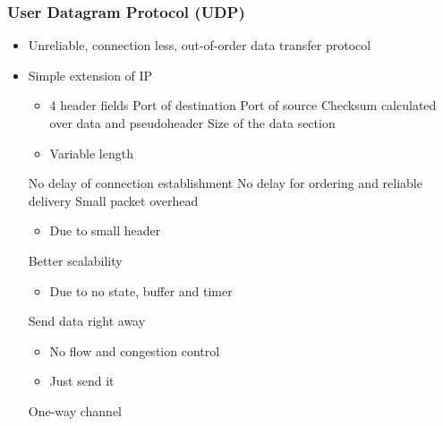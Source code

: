 \subsubsection{User Datagram Protocol (UDP)}
\begin{itemize}
    \item Unreliable, connection less, out-of-order data transfer protocol
    \item Simple extension of IP
        \begin{itemize}
            \item $4$ header fields
             Port of destination
             Port of source
             Checksum calculated over data and pseudoheader
             Size of the data section
        \end{itemize}
        \begin{itemize}
            \item Variable length
        \end{itemize}
    \ipro No delay of connection establishment
    \ipro No delay for ordering and reliable delivery
    \ipro Small packet overhead
        \begin{itemize}
            \item Due to small header
        \end{itemize}
    \ipro Better scalability
        \begin{itemize}
            \item Due to no state, buffer and timer
        \end{itemize}
    \ipro Send data right away
        \begin{itemize}
            \item No flow and congestion control
            \item Just send it
        \end{itemize}
     One-way channel
\end{itemize}

